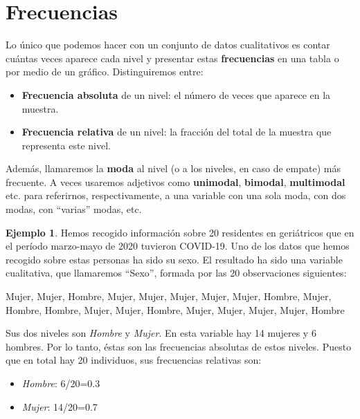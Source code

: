 \documentclass[
]{book}
\newenvironment{Shaded}{\begin{snugshade}}{\end{snugshade}}
\newcommand{\NormalTok}[1]{#1}
\theoremstyle{definition}
\theoremstyle{definition}
\newtheorem{example}{Ejemplo}[chapter]
\theoremstyle{definition}
\theoremstyle{definition}
\theoremstyle{remark}
\begin{document}
\hypertarget{sec:frecs}{%
\section{Frecuencias}\label{sec:frecs}}

Lo único que podemos hacer con un conjunto de datos cualitativos es contar cuántas veces aparece cada nivel y presentar estas \textbf{frecuencias} en una tabla o por medio de un gráfico. Distinguiremos entre:

\begin{itemize}
\item
  \textbf{Frecuencia absoluta} de un nivel: el número de veces que aparece en la muestra.
\item
  \textbf{Frecuencia relativa} de un nivel: la fracción del total de la muestra que representa este nivel.
\end{itemize}

Además, llamaremos la \textbf{moda} al nivel (o a los niveles, en caso de empate) más frecuente. A veces usaremos adjetivos como \textbf{unimodal}, \textbf{bimodal}, \textbf{multimodal} etc. para referirnos, respectivamente, a una variable con una sola moda, con dos modas, con ``varias'' modas, etc.

\begin{example}
\protect\hypertarget{exm:sexoger1}{}\label{exm:sexoger1}Hemos recogido información sobre 20 residentes en geriátricos que en el período marzo-mayo de 2020 tuvieron COVID-19. Uno de los datos que hemos recogido sobre estas personas ha sido su sexo. El resultado ha sido una variable cualitativa, que llamaremos ``Sexo'', formada por las 20 observaciones siguientes:
\end{example}

\begin{Shaded}
\begin{Highlighting}[]
\NormalTok{Mujer,  Mujer,  Hombre,  Mujer,  Mujer,  Mujer,  Mujer,  Mujer,  Hombre, Mujer,}
\NormalTok{Hombre,  Hombre,  Mujer,  Mujer,  Hombre,  Mujer,  Mujer,  Mujer,  Mujer,  Hombre}
\end{Highlighting}
\end{Shaded}

Sus dos niveles son \emph{Hombre} y \emph{Mujer}. En esta variable hay 14 mujeres y 6 hombres. Por lo tanto, éstas son las frecuencias absolutas de estos niveles. Puesto que en total hay 20 individuos, sus frecuencias relativas son:

\begin{itemize}
\item
  \emph{Hombre}: 6/20=0.3
\item
  \emph{Mujer}: 14/20=0.7
\end{itemize}
\end{document}
